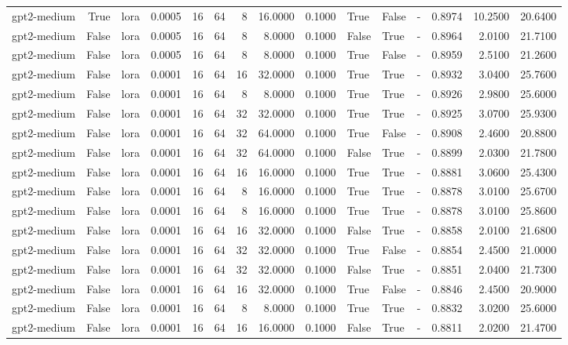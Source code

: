\begin{tabular}{lrlrrrrrrlllrrr}
gpt2-medium & True & lora & 0.0005 & 16 & 64 & 8 & 16.0000 & 0.1000 & True & False & - & 0.8974 & 10.2500 & 20.6400 \\
gpt2-medium & False & lora & 0.0005 & 16 & 64 & 8 & 8.0000 & 0.1000 & False & True & - & 0.8964 & 2.0100 & 21.7100 \\
gpt2-medium & False & lora & 0.0005 & 16 & 64 & 8 & 8.0000 & 0.1000 & True & False & - & 0.8959 & 2.5100 & 21.2600 \\
gpt2-medium & False & lora & 0.0001 & 16 & 64 & 16 & 32.0000 & 0.1000 & True & True & - & 0.8932 & 3.0400 & 25.7600 \\
gpt2-medium & False & lora & 0.0001 & 16 & 64 & 8 & 8.0000 & 0.1000 & True & True & - & 0.8926 & 2.9800 & 25.6000 \\
gpt2-medium & False & lora & 0.0001 & 16 & 64 & 32 & 32.0000 & 0.1000 & True & True & - & 0.8925 & 3.0700 & 25.9300 \\
gpt2-medium & False & lora & 0.0001 & 16 & 64 & 32 & 64.0000 & 0.1000 & True & False & - & 0.8908 & 2.4600 & 20.8800 \\
gpt2-medium & False & lora & 0.0001 & 16 & 64 & 32 & 64.0000 & 0.1000 & False & True & - & 0.8899 & 2.0300 & 21.7800 \\
gpt2-medium & False & lora & 0.0001 & 16 & 64 & 16 & 16.0000 & 0.1000 & True & True & - & 0.8881 & 3.0600 & 25.4300 \\
gpt2-medium & False & lora & 0.0001 & 16 & 64 & 8 & 16.0000 & 0.1000 & True & True & - & 0.8878 & 3.0100 & 25.6700 \\
gpt2-medium & False & lora & 0.0001 & 16 & 64 & 8 & 16.0000 & 0.1000 & True & True & - & 0.8878 & 3.0100 & 25.8600 \\
gpt2-medium & False & lora & 0.0001 & 16 & 64 & 16 & 32.0000 & 0.1000 & False & True & - & 0.8858 & 2.0100 & 21.6800 \\
gpt2-medium & False & lora & 0.0001 & 16 & 64 & 32 & 32.0000 & 0.1000 & True & False & - & 0.8854 & 2.4500 & 21.0000 \\
gpt2-medium & False & lora & 0.0001 & 16 & 64 & 32 & 32.0000 & 0.1000 & False & True & - & 0.8851 & 2.0400 & 21.7300 \\
gpt2-medium & False & lora & 0.0001 & 16 & 64 & 16 & 32.0000 & 0.1000 & True & False & - & 0.8846 & 2.4500 & 20.9000 \\
gpt2-medium & False & lora & 0.0001 & 16 & 64 & 8 & 8.0000 & 0.1000 & True & True & - & 0.8832 & 3.0200 & 25.6000 \\
gpt2-medium & False & lora & 0.0001 & 16 & 64 & 16 & 16.0000 & 0.1000 & False & True & - & 0.8811 & 2.0200 & 21.4700 \\

\end{tabular}
